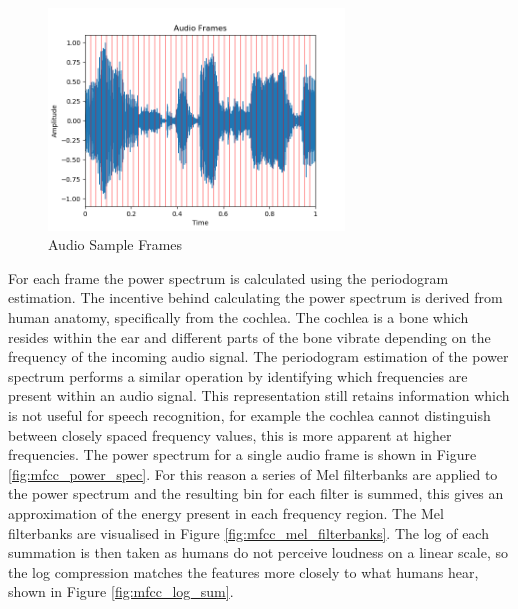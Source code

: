 \begin{figure}[h!]
    \centering
        \includegraphics[width=0.7\textwidth]{figures/mfcc/audio_frames.png}
    \caption{Audio Sample Frames}\label{fig:mfcc_audio_frames}
\end{figure} 

For each frame the power spectrum is calculated using the periodogram estimation.  
The incentive behind calculating the power spectrum is derived from human anatomy, specifically from the cochlea.
The cochlea is a bone which resides within the ear and different parts of the bone vibrate depending on the frequency of the incoming audio signal.
The periodogram estimation of the power spectrum performs a similar operation by identifying which frequencies are present within an audio signal.
This representation still retains information which is not useful for speech recognition, for example the cochlea cannot distinguish between closely spaced frequency values, this is more apparent at higher frequencies.
The power spectrum for a single audio frame is shown in Figure \ref{fig:mfcc_power_spec}.
For this reason a series of Mel filterbanks are applied to the power spectrum and the resulting bin for each filter is summed, this gives an approximation of the energy present in each frequency region.
The Mel filterbanks are visualised in Figure \ref{fig:mfcc_mel_filterbanks}.
The log of each summation is then taken as humans do not perceive loudness on a linear scale, so the log compression matches the features more closely to what humans hear, shown in Figure \ref{fig:mfcc_log_sum}.

